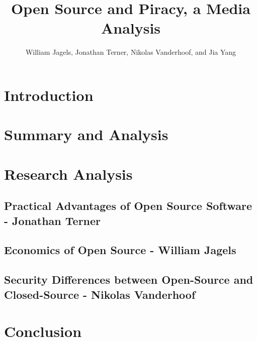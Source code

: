 \documentclass[12pt,babel,english,man,natbib,apacite]{apa6}
\title{Open Source and Piracy, a Media Analysis}
\author{William Jagels, Jonathan Terner, Nikolas Vanderhoof, and Jia Yang}
\affiliation{Binghamton University}
\begin{document}
\maketitle
\section{Introduction}
\section{Summary and Analysis}

\section{Research Analysis}
\subsection{Practical Advantages of Open Source Software - Jonathan Terner}

\subsection{Economics of Open Source - William Jagels}

\subsection{Security Differences between Open-Source and Closed-Source - Nikolas
            Vanderhoof}

\section{Conclusion}



\end{document}
